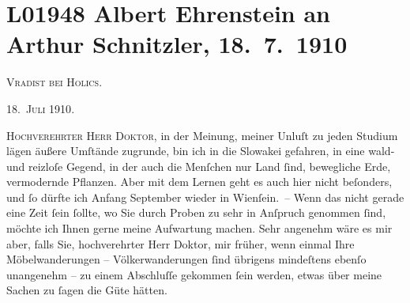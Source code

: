 

\section[Albert Ehrenstein an Arthur Schnitzler, 18. 7. 1910]{L01948 Albert Ehrenstein an Arthur Schnitzler, 18. 7. 1910}
\nopagebreak{}
\rehead{ }\normalsize\beginnumbering{}
\toendnotes[C]{\smallbreak\pagebreak[2]}
\toendnotes[C]{\smallbreak}
\toendnotes[C]{\smallbreak}
\pstart
           
\pstart
           {\pb}\textsc{Vradist bei Holics}.\pend
           
\pstart
           \raggedleft{}\textsc{18. Juli 1910}.\pend
           \pend
           
\pstart{}\textsc{Hochverehrter Herr Doktor,}\pend\vspace{0.5em}
\pstart
           in der Meinung, meiner Unluſt zu jeden Studium lägen äußere Umſtände zugrunde, bin
               ich in die Slowakei gefahren, in eine wald- und
               reizloſe Gegend, in der auch die Menſchen nur Land{ }ſind, bewegliche Erde, vermodernde
               Pflanzen. Aber mit dem Lernen geht es auch hier nicht beſonders, und{ }ſo dürfte ich
                  Anfang September wieder in Wienſein. – Wenn das nicht gerade eine Zeit{ }ſein{ }ſollte, wo Sie durch Proben zu sehr in Anſpruch genommen{ }ſind, möchte ich Ihnen gerne
               meine Aufwartung machen. Sehr angenehm wäre es mir aber, falls Sie, hochverehrter
               Herr Doktor, {\pb}mir
               früher, wenn einmal Ihre Möbelwanderungen – Völkerwanderungen{ }ſind übrigens
               mindeſtens ebenſo unangenehm – zu einem Abschluſſe gekommen{ }ſein werden, etwas über
               meine Sachen zu{ }ſagen die Güte hätten.\pend
           
